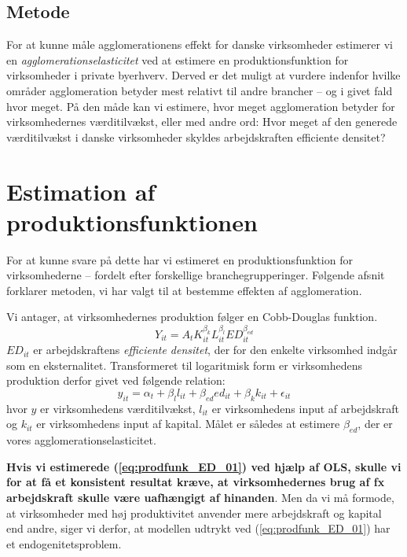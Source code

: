 \subsection{Metode}
\label{sec:Metodeafsnit}
For at kunne måle agglomerationens effekt for danske virksomheder estimerer vi en \emph{agglomerationselasticitet} ved at estimere en produktionsfunktion for virksomheder i private byerhverv. Derved er det muligt at vurdere indenfor hvilke områder agglomeration betyder mest relativt til andre brancher -- og i givet fald hvor meget. På den måde kan vi estimere, hvor meget agglomeration betyder for virksomhedernes værditilvækst, eller med andre ord: Hvor meget af den generede værditilvækst i danske virksomheder skyldes arbejdskraften efficiente densitet?
\section{Estimation af produktionsfunktionen}
For at kunne svare på dette har vi estimeret en produktionsfunktion for virksomhederne -- fordelt efter forskellige branchegrupperinger. Følgende afsnit forklarer metoden, vi har valgt til at bestemme effekten af agglomeration.

Vi antager, at virksomhedernes produktion følger en Cobb-Douglas funktion. 
\begin{equation}
	Y_{it} = A_t K_{it}^{\beta_k} L_{it}^{\beta_l} 
	ED_{it}^{\beta_{ed}}  
\end{equation}
$ED_{it}$ er arbejdskraftens \emph{efficiente densitet}, der for den enkelte virksomhed indgår som en eksternalitet.
Transformeret til logaritmisk form er virksomhedens produktion derfor givet ved følgende relation:
\begin{equation}
	y_{it} = \alpha_t + \beta_l l_{it} + \beta_{ed} ed_{it} + \beta_{k} k_{it} + \epsilon_{it}
	\label{eq:prodfunk_ED_01}
\end{equation}
hvor $y$ er virksomhedens værditilvækst, $l_{it}$ er virksomhedens input af arbejdskraft og $k_{it}$ er virksomhedens input af kapital. Målet er således at estimere $\beta_{ed}$, der er vores agglomerationselasticitet.

\textbf{Hvis vi estimerede (\ref{eq:prodfunk_ED_01}) ved hjælp af OLS, skulle vi for at få et konsistent resultat kræve, at virksomhedernes brug af fx arbejdskraft skulle være uafhængigt af hinanden}. Men da vi må formode, at virksomheder med høj produktivitet anvender mere arbejdskraft og kapital end andre, siger vi derfor, at modellen udtrykt ved (\ref{eq:prodfunk_ED_01}) har et endogenitetsproblem.

